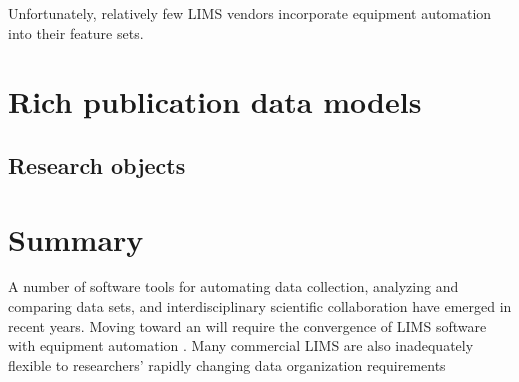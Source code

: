 \documentclass[../thesis]{subfiles}
\begin{document}
Unfortunately, relatively few \gls{LIMS} vendors incorporate equipment
automation into their feature sets.



\section{Rich publication data models}

\subsection{Research objects}







\section{Summary}

A number of software tools for automating data collection, analyzing
and comparing data sets, and interdisciplinary scientific
collaboration have emerged in recent years. Moving toward an    will
require the convergence of \gls{LIMS} software with equipment automation .
Many commercial \gls{LIMS} are also inadequately flexible to researchers'
rapidly changing data organization requirements
\end{document}
